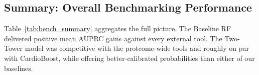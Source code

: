 \documentclass[conference]{IEEEtran}
\begin{document}
\begin{table}[h]
\centering
\caption{AUPRC Comparison: Our Models vs.\ CardioBoost.
  N/A indicates no CardioBoost scores available for \textit{TNNC1}.
  Best value per gene shown in \textbf{bold}.}
\label{tab:bench_cb}
\end{table}

\subsection{Summary: Overall Benchmarking Performance}

Table~\ref{tab:bench_summary} aggregates the full picture. The Baseline RF delivered positive mean AUPRC gains against every external tool. The Two-Tower model was competitive with the proteome-wide tools and roughly on par with CardioBoost, while offering better-calibrated probabilities than either of our baselines.
\end{document}
